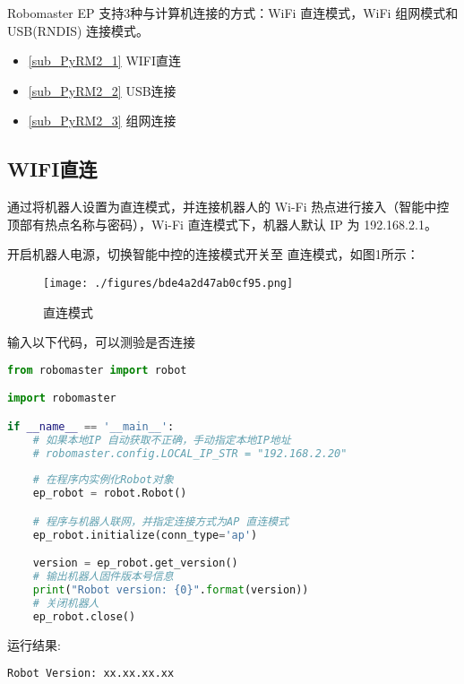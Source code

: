 

Robomaster EP 支持3种与计算机连接的方式：WiFi 直连模式，WiFi 组网模式和 USB(RNDIS) 连接模式。

\begin{itemize}
\item \autoref{sub_PyRM2_1} WIFI直连
\item \autoref{sub_PyRM2_2} USB连接
\item \autoref{sub_PyRM2_3} 组网连接
\end{itemize}

\subsection{WIFI直连}\label{sub_PyRM2_1}

通过将机器人设置为直连模式，并连接机器人的 Wi-Fi 热点进行接入（智能中控顶部有热点名称与密码），Wi-Fi 直连模式下，机器人默认 IP 为 192.168.2.1。

开启机器人电源，切换智能中控的连接模式开关至 直连模式，如图1所示：

\begin{figure}[ht]
\centering
\texttt{[image: ./figures/bde4a2d47ab0cf95.png]}
\caption{直连模式} \label{fig_PyRM2_1}
\end{figure}

输入以下代码，可以测验是否连接

\begin{lstlisting}[language=python]
from robomaster import robot

import robomaster

if __name__ == '__main__':
    # 如果本地IP 自动获取不正确，手动指定本地IP地址
    # robomaster.config.LOCAL_IP_STR = "192.168.2.20"
    
    # 在程序内实例化Robot对象
    ep_robot = robot.Robot()

    # 程序与机器人联网，并指定连接方式为AP 直连模式
    ep_robot.initialize(conn_type='ap')

    version = ep_robot.get_version()
    # 输出机器人固件版本号信息
    print("Robot version: {0}".format(version))
    # 关闭机器人
    ep_robot.close()
\end{lstlisting}

运行结果:
\begin{lstlisting}[language=pythonC]
Robot Version: xx.xx.xx.xx
\end{lstlisting}


